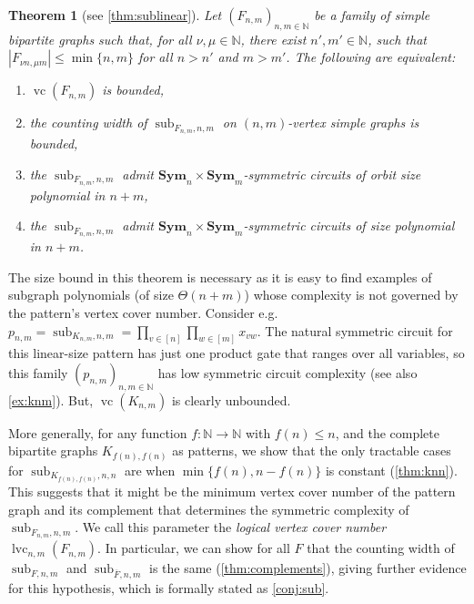 \documentclass[10pt,a4paper]{article}
\theoremstyle{definition}
\theoremstyle{plain}
\newtheorem{theorem}[definition]{Theorem}
\theoremstyle{remark}
\DeclareMathOperator{\sub}{sub}
\DeclareMathOperator{\vc}{vc}
\DeclareMathOperator{\cc}{lvc}
\newcommand{\Sym}{\mathbf{Sym}}
\newcommand{\bbN}{\mathbb{N}}
\begin{document}
\begin{theorem}[see \cref{thm:sublinear}]\label{thm:sublinear-intro}
	Let $(F_{n,m})_{n,m \in \mathbb{N}}$ be a family of simple bipartite graphs such that, 
	for all $\nu, \mu \in \mathbb{N}$,
	there exist $n',m' \in \mathbb{N}$,
	such that $|F_{\nu n, \mu m}| \leq \min \{n,m\}$ for all $n > n'$ and $m > m'$.
	The following are equivalent:
	\begin{enumerate}
		\item $\vc(F_{n,m})$ is bounded,
		\item the counting width of $\sub_{F_{n,m},n,m}$ on $(n,m)$-vertex simple graphs is bounded,
		\item the $\sub_{F_{n,m}, n, m}$ admit $\Sym_n \times \Sym_m$-symmetric circuits of orbit size polynomial in $n+m$,
		\item the $\sub_{F_{n,m}, n, m}$ admit $\Sym_n \times \Sym_m$-symmetric circuits of size polynomial in $n+m$.
	\end{enumerate}
\end{theorem}

The size bound in this theorem is necessary as it is easy to find examples of subgraph polynomials (of size $\Theta(n+m)$) whose complexity is not governed by the pattern's vertex cover number.
Consider e.g.\ $p_{n,m} = \sub_{K_{n,m},n,m} = \prod_{v \in [n]} \prod_{w \in [m]} x_{vw}$.  The natural symmetric circuit for this linear-size pattern has just one product gate that ranges over all variables, so this family $(p_{n,m})_{n,m \in \bbN}$ has low symmetric circuit complexity (see also \cref{ex:knm}). But, $\vc(K_{n,m})$ is clearly unbounded. 

More generally, for any function $f \colon \bbN \to \bbN$ with $f(n) \leq n$, and the complete bipartite graphs $K_{f(n),f(n)}$ as patterns, we  show that the only tractable cases for $\sub_{K_{f(n), f(n)},n,n}$ are when $\min \{ f(n), n-f(n) \}$ is constant (\cref{thm:knn}). This suggests that it might be the minimum vertex cover number of the pattern graph and its complement that determines the symmetric complexity of $\sub_{F_{n,m},n,m}$. We call this parameter the \emph{logical vertex cover number} $\cc_{n,m}(F_{n,m})$.
In particular, we can show for all $F$ that the counting width of $\sub_{F,n,m}$ and $\sub_{\overline{F},n,m}$ is the same (\cref{thm:complements}), giving further evidence for this hypothesis,
which is formally stated as \cref{conj:sub}.
\end{document}

